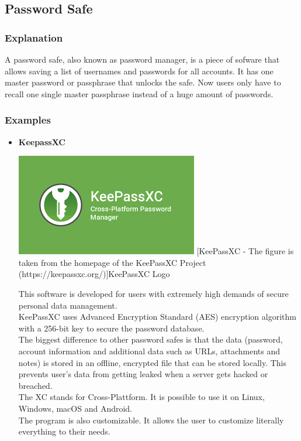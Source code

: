 \documentclass[conference]{IEEEtran}
\begin{document}
\subsection{Password Safe}
\subsubsection{Explanation}
A password safe, also known as password manager, is a piece of sofware that allows saving a list of usernames and passwords for all accounts. It has one master password or passphrase that unlocks the safe. Now users only have to recall one single master passphrase instead of a huge amount of passwords.
\subsubsection{Examples}
\begin{itemize}
\item \textbf{KeepassXC}\\ 
\begin{center}
\includegraphics[scale=0.6]{./images/KeePass.png}
[KeePassXC - The figure is taken from the homepage of the KeePassXC Project (https://keepassxc.org/)]{KeePassXC Logo}
\end{center}

This software is developed for users with extremely high demands of secure personal data management. \\
KeePassXC uses Advanced Encryption Standard (AES) encryption algorithm with a 256-bit key to secure the password database.\\
The biggest difference to other password safes is that the data (password, account information and additional data such as URLs, attachments and notes) is stored in an offline, encrypted file that can be stored locally. This prevents user's data from getting leaked when a server gets hacked or breached.\\
The XC stands for Cross-Plattform. It is possible to use it on Linux, Windows, macOS and Android.\\
The program is also customizable. It allows the user to customize literally everything to their needs.\cite{b6}\\



\end{itemize}
\end{document}
